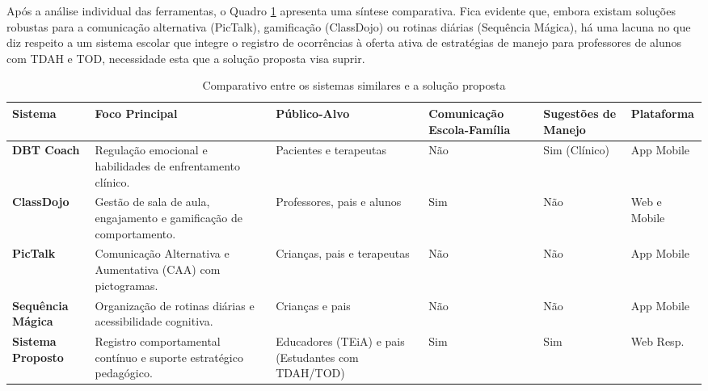 Após a análise individual das ferramentas, o Quadro \ref{quadro:comparativo_sistemas} apresenta uma síntese comparativa. Fica evidente que, embora existam soluções robustas para a comunicação alternativa (PicTalk), gamificação (ClassDojo) ou rotinas diárias (Sequência Mágica), há uma lacuna no que diz respeito a um sistema escolar que integre o registro de ocorrências à oferta ativa de estratégias de manejo para professores de alunos com TDAH e TOD, necessidade esta que a solução proposta visa suprir.

\begin{table}[H]
    \centering
    \caption{Comparativo entre os sistemas similares e a solução proposta}
    \label{quadro:comparativo_sistemas}
    \renewcommand{\arraystretch}{1.4} 
    \setlength{\tabcolsep}{3pt}
    \small 

    \begin{tabular}{|>{\raggedright\arraybackslash}p{2.4cm}|>{\raggedright\arraybackslash}p{3.8cm}|>{\raggedright\arraybackslash}p{2.5cm}|>{\centering\arraybackslash}p{2.4cm}|>{\centering\arraybackslash}p{2.0cm}|>{\raggedright\arraybackslash}p{1.8cm}|}
        \hline
        \textbf{Sistema} & \textbf{Foco Principal} & \textbf{Público-Alvo} & \textbf{Comunicação \newline Escola-Família} & \textbf{Sugestões \newline de Manejo} & \textbf{Plataforma} \\ \hline
        
        \textbf{DBT Coach} & Regulação emocional e habilidades de enfrentamento clínico. & Pacientes e terapeutas & Não & Sim (Clínico) & App Mobile \\ \hline
        
        \textbf{ClassDojo} & Gestão de sala de aula, engajamento e gamificação de comportamento. & Professores, pais e alunos & Sim & Não & Web e Mobile \\ \hline
        
        \textbf{PicTalk} & Comunicação Alternativa e Aumentativa (CAA) com pictogramas. & Crianças, pais e terapeutas & Não & Não & App Mobile \\ \hline
        
        \textbf{Sequência Mágica} & Organização de rotinas diárias e acessibilidade cognitiva. & Crianças e pais & Não & Não & App Mobile \\ \hline
        
        \textbf{Sistema Proposto} & Registro comportamental contínuo e suporte estratégico pedagógico. & Educadores (TEiA) e pais \newline (Estudantes com TDAH/TOD) & Sim & Sim & Web Resp. \\ \hline
    \end{tabular}
    
    \vspace{0.2cm}
\end{table}

